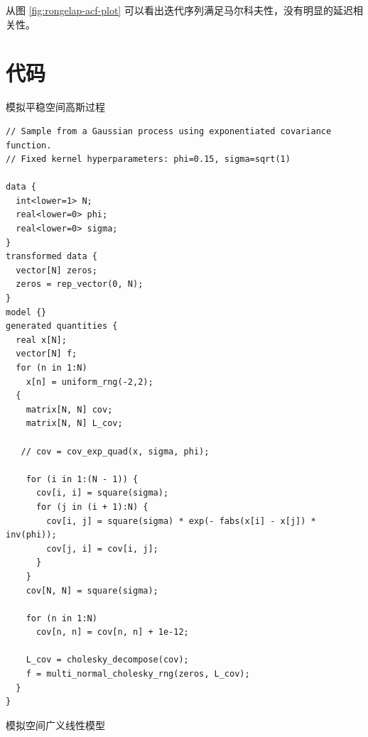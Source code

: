 \documentclass[12pt,a4paper,UTF8,twoside]{book}
\theoremstyle{definition}
\theoremstyle{definition}
\theoremstyle{definition}
\theoremstyle{remark}
\begin{document}
从图 \ref{fig:rongelap-acf-plot}
可以看出迭代序列满足马尔科夫性，没有明显的延迟相关性。








\hypertarget{simulate-code}{%
\section*{代码}\label{simulate-code}}

模拟平稳空间高斯过程

\begin{verbatim}
// Sample from a Gaussian process using exponentiated covariance function.
// Fixed kernel hyperparameters: phi=0.15, sigma=sqrt(1)

data {
  int<lower=1> N;
  real<lower=0> phi;
  real<lower=0> sigma;
}
transformed data {
  vector[N] zeros;
  zeros = rep_vector(0, N);
}
model {}
generated quantities {
  real x[N];
  vector[N] f;
  for (n in 1:N)
    x[n] = uniform_rng(-2,2);
  {
    matrix[N, N] cov;
    matrix[N, N] L_cov;
    
   // cov = cov_exp_quad(x, sigma, phi);

    for (i in 1:(N - 1)) {
      cov[i, i] = square(sigma);
      for (j in (i + 1):N) {
        cov[i, j] = square(sigma) * exp(- fabs(x[i] - x[j]) * inv(phi));
        cov[j, i] = cov[i, j];
      }
    }
    cov[N, N] = square(sigma); 
    
    for (n in 1:N)
      cov[n, n] = cov[n, n] + 1e-12;

    L_cov = cholesky_decompose(cov);
    f = multi_normal_cholesky_rng(zeros, L_cov);
  }
}
\end{verbatim}

模拟空间广义线性模型
\end{document}
